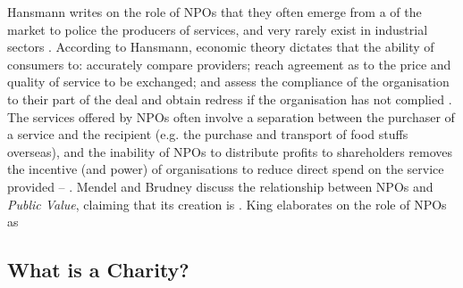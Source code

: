 %
Hansmann writes on the role of NPOs that they often emerge from a  of the market to police the producers of services, and very rarely exist in industrial sectors \cite{hansmann_role_1980}. According to Hansmann, economic theory dictates that the ability of consumers to: accurately compare providers; reach agreement as to the price and quality of service to be exchanged; and assess the compliance of the organisation to their part of the deal and obtain redress if the organisation has not complied \cite{hansmann_role_1980}. The services offered by NPOs often involve a separation between the purchaser of a service and the recipient (e.g. the purchase and transport of food stuffs overseas), and the inability of NPOs to distribute profits to shareholders removes the incentive (and power) of organisations to reduce direct spend on the service provided --  \cite{hansmann_role_1980}.
%
Mendel and Brudney discuss the relationship between NPOs and \textit{Public Value}, claiming that its creation is  \cite{mendel_doing_2014}. King elaborates on the role of NPOs as 


\subsection{What is a Charity?}
%
